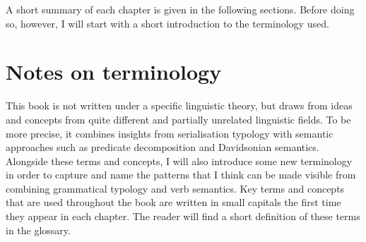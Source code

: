 A short summary of each chapter is given in the following sections. Before doing so, however, I will start with a short introduction to the terminology used.

\section*{Notes on terminology}

This book is not written under a specific linguistic theory, but draws from ideas and concepts from quite different and partially unrelated linguistic fields. To be more precise, it combines insights from serialisation typology with semantic approaches such as predicate decomposition and Davidsonian semantics. Alongside these terms and concepts, I will also introduce some new terminology in order to capture and name the patterns that I think can be made visible from combining grammatical typology and verb semantics. Key terms and concepts that are used throughout the book are written in small capitals the first time they appear in each chapter. The reader will find a short definition of these terms in the glossary.

